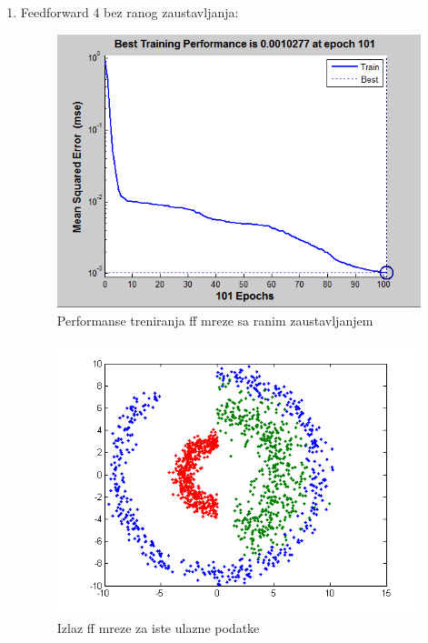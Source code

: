\documentclass{report}
\begin{document}
\begin{enumerate}
\begin{enumerate}
\newpage
\item\LARGE
Feedforward 4 bez ranog zaustavljanja:\large

\begin{figure}[!h]
\begin{center}
\includegraphics[scale=0.8]{B1performanceFF4.png}
\caption{Performanse treniranja ff mreze sa ranim zaustavljanjem}
\end{center}
\end{figure}

\begin{figure}[!h]
\begin{center}
\includegraphics[scale=0.8]{B1outputFF4Same.png}
\caption{Izlaz ff mreze za iste ulazne podatke}
\end{center}
\end{figure}


\end{enumerate}
\end{enumerate}
\end{document}
